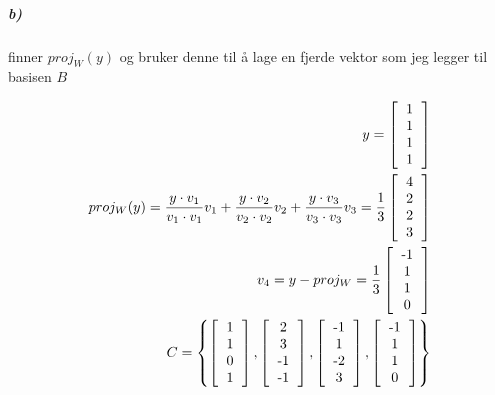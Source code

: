\documentclass[11pt, A4paper,norsk]{article}
\begin{document}
			\subparagraph{b)}
				\begin{flushleft}
finner $proj_W(y)$ og bruker denne til å lage en fjerde vektor som jeg legger til basisen $B$
				\end{flushleft}
				\begin{align}
y = 
\left[
\begin{tabular} { c }
1 \\
1 \\
1 \\
1
\end{tabular}
\right] \\
proj_W (y) = \frac{y \cdot v_1}{v_1 \cdot v_1}v_1 + \frac{y \cdot v_2}{v_2 \cdot v_2}v_2 + \frac{y \cdot v_3}{v_3 \cdot v_3}v_3 = \frac{1}{3} 
\left[
\begin{tabular} { c }
4 \\
2 \\
2 \\
3
\end{tabular}
\right] \\
v_4 = y - proj_W = \frac{1}{3}
\left[
\begin{tabular} { c }
-1 \\
1 \\
1 \\
0
\end{tabular}
\right] \\
C =
\left \{ 
\left[
\begin{tabular} { c }
1 \\
1 \\
0 \\
1
\end{tabular}
\right]
,
\left[
\begin{tabular} { c }
2 \\
3 \\
-1 \\
-1
\end{tabular}
\right]
,
\left[
\begin{tabular} { c }
-1 \\
1 \\
-2 \\
3
\end{tabular}
\right]
,
\left[
\begin{tabular} { c }
-1 \\
1 \\
1 \\
0
\end{tabular}
\right]
\right \}
				\end{align}
\end{document}
